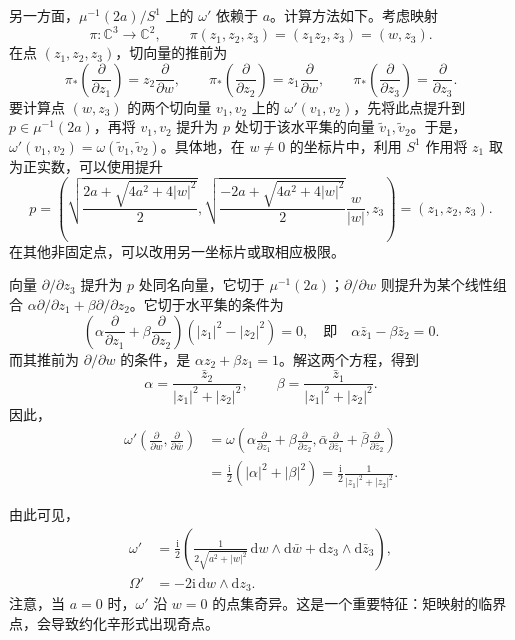 另一方面，$\mu^{-1}(2a)/S^1$ 上的 $\omega'$ 依赖于 $a$。计算方法如下。考虑映射
\[
\pi\colon\mathbb C^3\longrightarrow\mathbb C^2,
\qquad\pi(z_1,z_2,z_3)=(z_1z_2,z_3)=(w,z_3).
\]
在点 $(z_1,z_2,z_3)$，切向量的推前为
\[
\pi_*\left(\frac\partial{\partial z_1}\right)
=z_2\frac\partial{\partial w},\qquad
\pi_*\left(\frac\partial{\partial z_2}\right)
=z_1\frac\partial{\partial w},\qquad
\pi_*\left(\frac\partial{\partial z_3}\right)
=\frac\partial{\partial z_3}.
\]
要计算点 $(w,z_3)$ 的两个切向量 $v_1,v_2$ 上的 $\omega'(v_1,v_2)$，先将此点提升到 $p\in\mu^{-1}(2a)$，再将 $v_1,v_2$ 提升为 $p$ 处切于该水平集的向量 $\widetilde v_1,\widetilde v_2$。于是，$\omega'(v_1,v_2)=\omega(\widetilde v_1,\widetilde v_2)$。具体地，在 $w\neq0$ 的坐标片中，利用 $S^1$ 作用将 $z_1$ 取为正实数，可以使用提升
\[
p=\left(
\sqrt{\frac{2a+\sqrt{4a^2+4|w|^2}}2},
\sqrt{\frac{-2a+\sqrt{4a^2+4|w|^2}}2}\frac w{|w|},
z_3\right)=(z_1,z_2,z_3).
\]
在其他非固定点，可以改用另一坐标片或取相应极限。

向量 $\partial/\partial z_3$ 提升为 $p$ 处同名向量，它切于 $\mu^{-1}(2a)$；$\partial/\partial w$ 则提升为某个线性组合 $\alpha\partial/\partial z_1+\beta\partial/\partial z_2$。它切于水平集的条件为
\[
\left(\alpha\frac\partial{\partial z_1}
+\beta\frac\partial{\partial z_2}\right)
(|z_1|^2-|z_2|^2)=0,
\quad\text{即}\quad\alpha\bar z_1-\beta\bar z_2=0.
\]
而其推前为 $\partial/\partial w$ 的条件，是 $\alpha z_2+\beta z_1=1$。解这两个方程，得到
\[
\alpha=\frac{\bar z_2}{|z_1|^2+|z_2|^2},\qquad
\beta=\frac{\bar z_1}{|z_1|^2+|z_2|^2}.
\]
因此，
\[
\begin{aligned}
\omega'\left(\frac\partial{\partial w},\frac\partial{\partial\bar w}\right)
&=\omega\left(
\alpha\frac\partial{\partial z_1}+\beta\frac\partial{\partial z_2},
\bar\alpha\frac\partial{\partial\bar z_1}+\bar\beta\frac\partial{\partial\bar z_2}\right)\\
&=\frac{\mathrm i}2(|\alpha|^2+|\beta|^2)
=\frac{\mathrm i}2\frac1{|z_1|^2+|z_2|^2}.
\end{aligned}
\]

由此可见，
\[
\begin{aligned}
\omega'&=\frac{\mathrm i}2\left(
\frac1{2\sqrt{a^2+|w|^2}}\,\mathrm dw\wedge\mathrm d\bar w
+\mathrm dz_3\wedge\mathrm d\bar z_3\right),\\
\Omega'&=-2\mathrm i\,\mathrm dw\wedge\mathrm dz_3.
\end{aligned}
\]
注意，当 $a=0$ 时，$\omega'$ 沿 $w=0$ 的点集奇异。这是一个重要特征：矩映射的临界点，会导致约化辛形式出现奇点。

